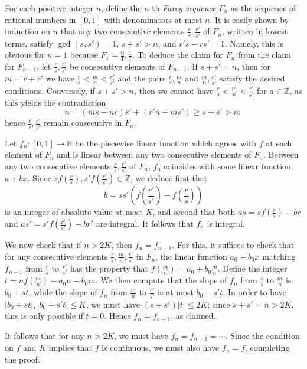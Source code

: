 \documentclass[amssymb,twocolumn,pra,10pt,aps]{revtex4-1}
\newcommand{\RR}{\mathbb{R}}
\newcommand{\ZZ}{\mathbb{Z}}
\begin{document}
\begin{itemize}
For each positive integer $n$, define the $n$-th \emph{Farey sequence} $F_n$ as the sequence of rational numbers in $[0,1]$ with denominators at most $n$.
It is easily shown by induction on $n$ that any two consecutive elements $\frac{r}{s}, \frac{r'}{s'}$ of $F_n$, written in lowest terms, satisfy $\gcd(s,s') = 1$, $s+s' > n$, and $r's - r s' = 1$. Namely, this is obvious for $n=1$ because $F_1 = \frac{0}{1}, \frac{1}{1}$. To deduce the claim for $F_n$ from the claim for $F_{n-1}$, let $\frac{r}{s}, \frac{r'}{s'}$ be consecutive elements of $F_{n-1}$. If $s+s' = n$, then for $m = r+r'$ we have $\frac{r}{s} < \frac{m}{n} < \frac{r'}{s'}$ and the pairs $\frac{r}{s},\frac{m}{n}$ and $\frac{m}{n}, \frac{r'}{s'}$ 
satisfy the desired conditions. Conversely, if $s+s' > n$, then we cannot have $\frac{r}{s} < \frac{m}{n} < \frac{r'}{s'}$ for $a \in \ZZ$, as this yields the contradiction
\[
n =(ms - nr)s' + (r'n - ms') \geq s+s' > n;
\]
hence $\frac{r}{s}, \frac{r'}{s'}$ remain consecutive in $F_n$. 

Let $f_n: [0,1] \to \RR$ be the piecewise linear function which agrees with $f$ at each element of $F_n$ and is linear between any two consecutive elements of $F_n$.
Between any two consecutive elements $\frac{r}{s}, \frac{r'}{s'}$ of $F_n$,
$f_n$ coincides with some linear function $a+bx$. Since $s f(\frac{r}{s}), s' f(\frac{r'}{s'}) \in \ZZ$, we deduce first that
\[
b = ss' (f(\frac{r'}{s'}) - f(\frac{r}{s}))
\]
is an integer of absolute value at most $K$,
and second that both $as = s f(\frac{r}{s}) - br$ and $as' = s' f(\frac{r'}{s'}) - br'$ are integral. It follows that $f_n$ is integral.

We now check that if $n > 2K$, then $f_n = f_{n-1}$. 
For this, it suffices to check that for any consecutive elements $\frac{r}{s}, \frac{m}{n}, \frac{r'}{s'}$ in $F_n$, the linear function $a_0 + b_0 x$ matching $f_{n-1}$ from $\frac{r}{s}$ to $\frac{r'}{s'}$ has the property that $f(\frac{m}{n}) = a_0 + b_0 \frac{m}{n}$. Define the integer $t = nf(\frac{m}{n}) - a_0 n - b_0 m$. 
We then compute that the slope of $f_n$ from $\frac{r}{s}$ to $\frac{m}{n}$ is $b_0+st$,
while the slope of $f_n$ from $\frac{m}{n}$ to $\frac{r'}{s'}$ is at most $b_0 -s't$.
In order to have $\left| b_0 + s t\right|, \left| b_0 - s' t\right| \leq K$, we must have
$(s+s') \left| t \right| \leq 2K$; since $s+s' = n > 2K$, this is only possible if $t=0$.
Hence $f_n = f_{n-1}$, as claimed.

It follows that for any $n > 2K$, we must have $f_n = f_{n+1} = \cdots$. Since the condition on $f$ and $K$ implies that $f$ is continuous, we must also have $f_n = f$, completing the proof.


\end{itemize}
\end{document}
